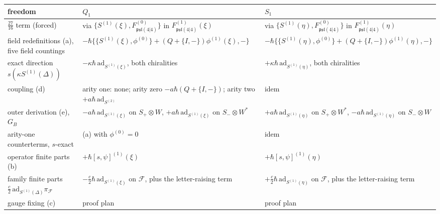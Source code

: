\begin{tabular}{l|l|l}
freedom & $Q_1$ & $S_1$ \\
\hline
$\tfrac{27}{16}$ term (forced) & via $\{S^{(1)}(\xi),F^{(0)}_{\mathfrak{psl}(4|4)}\}$ in $F^{(1)}_{\mathfrak{psl}(4|4)}(\xi)$ & via $\{S^{(1)}(\eta),F^{(0)}_{\mathfrak{psl}(4|4)}\}$ in $F^{(1)}_{\mathfrak{psl}(4|4)}(\eta)$ \\
field redefinitions (a), five field countings & $-\hbar\{\{S^{(1)}(\xi),\phi^{(0)}\}+(Q+\{I,-\})\phi^{(1)}(\xi),-\}$ & $-\hbar\{\{S^{(1)}(\eta),\phi^{(0)}\}+(Q+\{I,-\})\phi^{(1)}(\eta),-\}$ \\
exact direction $s(\kappa S^{(1)}(\Delta))$ & $-\kappa\hbar\,\mathrm{ad}_{S^{(1)}(\xi)}$, both chiralities & $+\kappa\hbar\,\mathrm{ad}_{S^{(1)}(\eta)}$, both chiralities \\
coupling (d) & arity one: none; arity zero $-a\hbar(Q+\{I,-\})$; arity two $+a\hbar\,\mathrm{ad}_{S^{(2)}}$ & idem \\
outer derivation (e), $G_B$ & $-a\hbar\,\mathrm{ad}_{S^{(1)}(\xi)}$ on $S_+\otimes W$, $+a\hbar\,\mathrm{ad}_{S^{(1)}(\xi)}$ on $S_-\otimes W^*$ & $+a\hbar\,\mathrm{ad}_{S^{(1)}(\eta)}$ on $S_+\otimes W^*$, $-a\hbar\,\mathrm{ad}_{S^{(1)}(\eta)}$ on $S_-\otimes W$ \\
arity-one counterterms, $s$-exact & (a) with $\phi^{(0)}=0$ & idem \\
operator finite parts (b) & $+\hbar[s,\psi]^{(1)}(\xi)$ & $+\hbar[s,\psi]^{(1)}(\eta)$ \\
family finite parts $\tfrac c2\,\mathrm{ad}_{S^{(1)}(\Delta)}\pi_{\mathcal F}$ & $-\tfrac c2\hbar\,\mathrm{ad}_{S^{(1)}(\xi)}$ on $\mathcal F$, plus the letter-raising term & $+\tfrac c2\hbar\,\mathrm{ad}_{S^{(1)}(\eta)}$ on $\mathcal F$, plus the letter-raising term \\
gauge fixing (c) & proof plan & proof plan \\
\end{tabular}

